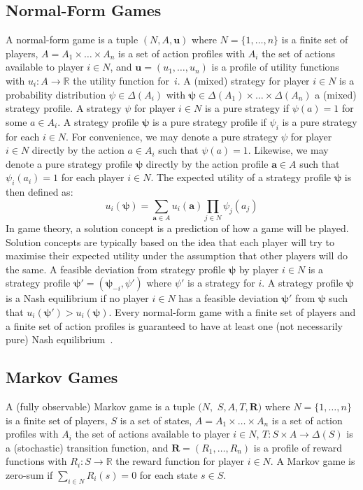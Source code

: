 \documentclass[10pt]{article}
\theoremstyle{plain}
\newcommand{\vect}[1]{\bm{#1}}
\begin{document}
\subsection{Normal-Form Games}
A normal-form game is a tuple $(N, A, \vect{u})$ where $N = \{ 1, \dots, n \}$ is a finite set of players, $A = A_{1} \times \dots \times A_{n}$ is a set of action profiles with $A_{i}$ the set of actions available to player $i \in N$, and $\vect{u} = (u_{1}, \dots, u_{n})$ is a profile of utility functions with $u_{i} : A \to \mathbb{R}$ the utility function for~$i$.
A (mixed) strategy for player $i \in N$ is a probability distribution $\psi \in \Delta(A_{i})$ with $\vect{\psi} \in \Delta(A_{1}) \times \dots \times \Delta(A_{n})$ a (mixed) strategy profile.
A strategy $\psi$ for player $i \in N$ is a pure strategy if $\psi(a) = 1$ for some $a \in A_{i}$.
A strategy profile $\vect{\psi}$ is a pure strategy profile if $\psi_{i}$ is a pure strategy for each $i \in N$.
For convenience, we may denote a pure strategy $\psi$ for player $i \in N$ directly by the action $a \in A_{i}$ such that $\psi(a) = 1$.
Likewise, we may denote a pure strategy profile $\vect{\psi}$ directly by the action profile $\vect{a} \in A$ such that $\psi_{i}(a_{i}) = 1$ for each player $i \in N$.
The expected utility of a strategy profile $\vect{\psi}$ is then defined as:
\begin{equation*}
	u_{i}(\vect{\psi}) = \sum_{\vect{a} \in A} u_{i}(\vect{a}) \prod_{j \in N} \psi_{j}(a_{j})
\end{equation*}
In game theory, a solution concept is a prediction of how a game will be played.
Solution concepts are typically based on the idea that each player will try to maximise their expected utility under the assumption that other players will do the same.
A feasible deviation from strategy profile $\vect{\psi}$ by player $i \in N$ is a strategy profile $\vect{\psi'} = (\vect{\psi}_{-i}, \psi')$ where $\psi'$ is a strategy for $i$.
A strategy profile $\vect{\psi}$ is a Nash equilibrium if no player $i \in N$ has a feasible deviation $\vect{\psi'}$ from $\vect{\psi}$ such that $u_{i}(\vect{\psi'}) > u_{i}(\vect{\psi})$.
Every normal-form game with a finite set of players and a finite set of action profiles is guaranteed to have at least one (not necessarily pure) Nash equilibrium~\cite{Nash:AM:1951}.

\subsection{Markov Games}
A (fully observable) Markov game is a tuple $(N,$ $S, A, T, \vect{R})$ where
$N = \{ 1, \dots, n \}$ is a finite set of players,
$S$ is a set of states,
$A = A_{1} \times \dots \times A_{n}$ is a set of action profiles with $A_{i}$ the set of actions available to player $i \in N$,
$T : S \times A \to \Delta(S)$ is a (stochastic) transition function, and
$\vect{R} = (R_{1}, \dots, R_{n})$ is a profile of reward functions with $R_{i} : S \to \mathbb{R}$ the reward function for player $i \in N$.
A Markov game is zero-sum if $\sum_{i \in N} R_{i}(s) = 0$ for each state $s \in S$.
\end{document}
